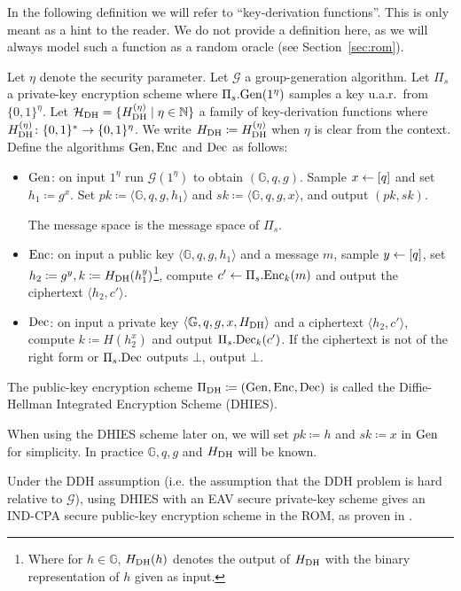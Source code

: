 In the following definition we will refer to ``key-derivation functions''. This is only meant as a hint to the reader. We do not provide a definition here, as we will always model such a function as a random oracle (see Section~\vref{sec:rom}).

\begin{definition}
	Let $\eta$ denote the security parameter. Let $\mathcal{G}$ a group-generation algorithm. Let $\Pi_s$ a private-key encryption scheme where $\Pi_s.\mathrm{Gen}(1^\eta)$ samples a key u.a.r.\ from $\{0, 1\}^\eta$. Let $\mathcal{H}_\mathrm{DH} = \{H_\mathrm{DH}^{(\eta)} \mid \eta \in \mathbb{N} \}$ a family of key-derivation functions where $H_\mathrm{DH}^{(\eta)} \colon \{0, 1\}^* \to \{0, 1\}^{\eta}$. We write $H_\mathrm{DH} \coloneqq H_\mathrm{DH}^{(\eta)}$ when $\eta$ is clear from the context. Define the algorithms $\mathrm{Gen}, \mathrm{Enc}$ and $\mathrm{Dec}$ as follows:
	\begin{itemize}
		\item $\mathrm{Gen}$: on input $1^\eta$ run $\mathcal{G}(1^\eta)$ to obtain $(\mathbb{G}, q, g)$. Sample $x \leftarrow [q]$ and set $h_1 \coloneqq g^x$. Set $pk \coloneqq \langle \mathbb{G}, q, g, h_1 \rangle$ and $sk \coloneqq \langle \mathbb{G}, q, g, x \rangle$, and output $(pk, sk)$.

		      The message space is the message space of $\Pi_s$.
		\item $\mathrm{Enc}$: on input a public key $\langle \mathbb{G}, q, g, h_1 \rangle$ and a message $m$, sample $y \leftarrow [q]$, set $h_2 \coloneqq g^y, k \coloneqq H_\mathrm{DH}(h_1^y)$\footnote{Where for $h \in \mathbb{G}$, $H_\mathrm{DH}(h)$ denotes the output of $H_\mathrm{DH}$ with the binary representation of $h$ given as input.}, compute $c' \leftarrow \Pi_s.\mathrm{Enc}_k(m)$ and output the ciphertext $\langle h_2, c' \rangle$.
		\item $\mathrm{Dec}$: on input a private key $\langle \mathbb{G}, q, g, x, H_\mathrm{DH} \rangle$ and a ciphertext $\langle h_2, c' \rangle$, compute $k \coloneqq H(h_2^x)$ and output $\Pi_s.\mathrm{Dec}_k(c')$. If the ciphertext is not of the right form or $\Pi_s.\mathrm{Dec}$ outputs $\bot$, output $\bot$.
	\end{itemize}
	The public-key encryption scheme $\Pi_{\mathrm{DH}} \coloneqq (\mathrm{Gen}, \mathrm{Enc}, \mathrm{Dec})$ is called the Diffie-Hellman Integrated Encryption Scheme (DHIES).

	When using the DHIES scheme later on, we will set $pk \coloneqq h $ and $sk \coloneqq x$ in $\mathrm{Gen}$ for simplicity. In practice $\mathbb{G}, q, g$ and $H_\mathrm{DH}$ will be known.
\end{definition}

Under the DDH assumption (i.e. the assumption that the DDH problem is hard relative to $\mathcal{G}$), using DHIES with an EAV secure private-key scheme gives an IND-CPA secure public-key encryption scheme in the ROM, as proven in \cite[Theorem~12.12]{introduction-to-modern-cryptography}.
